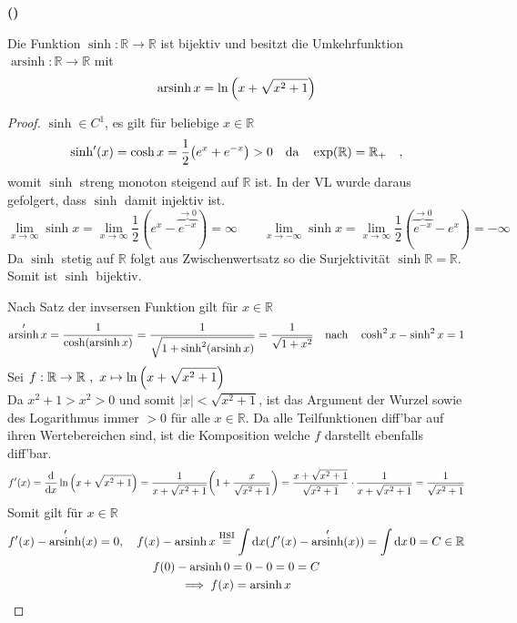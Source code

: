 \documentclass[a4paper, 12pt]{scrartcl}
\DeclareMathOperator{\arsinh}{arsinh}
\newcounter{taski}
\newcounter{taskii}[taski]
\newcommand{\ttask}{\stepcounter{taskii}\textbf{(\alph{taskii})}~}
\begin{document}
\ttask
\begin{theorem}
    Die Funktion $\sinh : \mathbb{R} \rightarrow \mathbb{R}$ ist bijektiv und besitzt die Umkehrfunktion $\arsinh : \mathbb{R} \rightarrow \mathbb{R}$ mit
    \[ \arsinh x = \ln \qty(x+\sqrt{x^2+1}) \]
\end{theorem}
\begin{proof}
$\sinh \in C^1$, es gilt für beliebige $x \in \mathbb{R}$
\[ \sinh'(x) = \cosh x = \frac{1}{2}\qty(e^x + e^{-x}) > 0 \qq{da} \exp(\mathbb{R}) = \mathbb{R_+} \quad, \]
womit $\sinh$ streng monoton steigend auf $\mathbb{R}$ ist. In der VL wurde daraus gefolgert, dass $\sinh$ damit injektiv ist.
\[
    \lim_{x \rightarrow \infty} \sinh x =  \lim_{x \rightarrow \infty} \frac{1}{2}(e^x - \overbrace{e^{-x}}^{\rightarrow 0}) = \infty \qquad \lim_{x \rightarrow -\infty} \sinh x =  \lim_{x \rightarrow \infty} \frac{1}{2}(\overbrace{e^{-x}}^{\rightarrow 0} - e^{x}) = -\infty
\]
Da $\sinh$ stetig auf $\mathbb{R}$ folgt aus Zwischenwertsatz so die Surjektivität $\sinh \mathbb{R} = \mathbb{R}$. Somit ist $\sinh$ bijektiv.

Nach Satz der invsersen Funktion gilt für $x \in \mathbb{R}$
\[
\arsinh'x = \frac{1}{\cosh(\arsinh x)}
= \frac{1}{\sqrt{1 + \sinh^2(\arsinh x)}}
= \frac{1}{\sqrt{1+x^2}}  \qq{nach} \cosh^2 x - \sinh^2 x = 1
\]
Sei $\displaystyle f: \mathbb{R} \rightarrow \mathbb{R} ~,~ x \mapsto \ln \qty(x+\sqrt{x^2+1})$ \\
Da $x^2+1 > x^2 > 0$ und somit $|x| < \sqrt{x^2+1}$, ist das Argument der Wurzel sowie des Logarithmus immer $>0$ für alle $x \in \mathbb{R}$. Da alle Teilfunktionen diff'bar auf ihren Wertebereichen sind, ist die Komposition welche $f$ darstellt ebenfalls diff'bar.
\[ 
    f'(x) = \dv{x} \ln \qty(x+\sqrt{x^2+1})
    = \frac{1}{x+\sqrt{x^2+1}} \qty(1+\frac{x}{\sqrt{x^2+1}})
    = \frac{x+\sqrt{x^2+1}}{\sqrt{x^2+1}} \cdot \frac{1}{x+\sqrt{x^2+1}}
    = \frac{1}{\sqrt{x^2+1}} 
\]
Somit gilt für $x \in \mathbb{R}$
\begin{gather*}
    f'(x) - \arsinh'(x) = 0 \qc f(x) - \arsinh x \overset{\text{HSI}}= \int \dd x (f'(x) - \arsinh'(x)) = \int \dd x \, 0 = C \in \mathbb{R}\\
    f(0) - \arsinh 0 = 0 - 0 = 0 = C \\
    \implies f(x) = \arsinh x
\end{gather*}

\end{proof}
\end{document}
